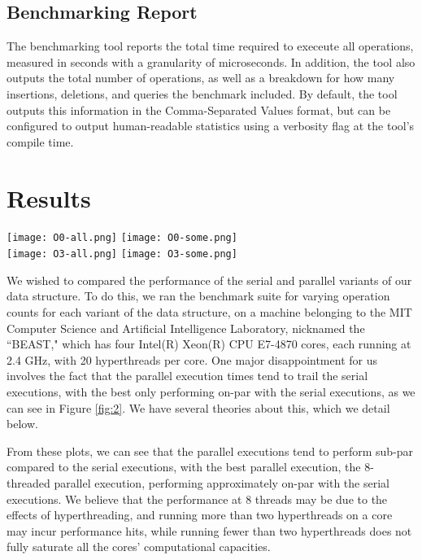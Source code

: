 \documentclass[10pt]{article}
\begin{document}
\subsection{Benchmarking Report}
The benchmarking tool reports the total time required to execeute all operations, measured in seconds with a granularity of microseconds. In addition, the tool also outputs the total number of operations, as well as a breakdown for how many insertions, deletions, and queries the benchmark included. By default, the tool outputs this information in the Comma-Separated Values format, but can be configured to output human-readable statistics using a verbosity flag at the tool's compile time.

\section{Results}

\begin{figure*}[h!,width=\textwidth]
\centering
\texttt{[image: O0-all.png]}
\texttt{[image: O0-some.png]}\\
\texttt{[image: O3-all.png]}
\texttt{[image: O3-some.png]}
\caption{Plots of runtimes for different variations of the data structure, given varying numbers of operations, with 90\% reads and 10\% writes. The top pair indicate times when compiled with the gcc -O0 flag, while the bottom pair indicates times compiled with the gcc -O3 flag. The left two plots contain data regarding all variants for all operation counts, while the right half plots only selected data to emphasize the runtime differences.}
\label{fig:2}
\end{figure*}

We wished to compared the performance of the serial and parallel variants of our data structure. To do this, we ran the benchmark suite for varying operation counts for each variant of the data structure, on a machine belonging to the MIT Computer Science and Artificial Intelligence Laboratory, nicknamed the ``BEAST," which has four Intel(R) Xeon(R) CPU E7-4870 cores, each running at 2.4 GHz, with 20 hyperthreads per core. One major disappointment for us involves the fact that the parallel execution times tend to trail the serial executions, with the best only performing on-par with the serial executions, as we can see in Figure \ref{fig:2}. We have several theories about this, which we detail below.

From these plots, we can see that the parallel executions tend to perform sub-par compared to the serial executions, with the best parallel execution, the 8-threaded parallel execution, performing approximately on-par with the serial executions. We believe that the performance at 8 threads may be due to the effects of hyperthreading, and running more than two hyperthreads on a core may incur performance hits, while running fewer than two hyperthreads does not fully saturate all the cores' computational capacities.
\end{document}
